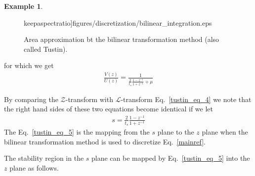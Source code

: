 \documentclass[11pt,a4paper,oneside]{book}
\numberwithin{equation}{section}
\theoremstyle{it}
\theoremstyle{definition}
\newtheorem{example}{Example}[chapter]
\begin{document}
\begin{example}
\begin{figure}[H]
	keepaspectratio]{figures/discretization/bilinear_integration.eps}
	\captionsetup{width=0.5\textwidth, font=small}		
	\caption{Area approximation bt the bilinear transformation method (also 
	called Tustin).}
	\label{figure_discretization_4}
\end{figure}
for which we get
\begin{equation}\label{tustin_eq_4}
	\begin{split}
		\frac{V(z)}{U(z)} = \frac{1}{\frac{2}{t_s}\frac{1-z^{-1}}{1+z^{-1}}+\mu}
	\end{split}
\end{equation}
\begin{mybox}
	By comparing the $\mathcal{Z}$-transform with $\mathcal{L}$-transform 
	Eq.~\eqref{tustin_eq_4} we note that the right hand sides of these two 
	equations become identical if we let
	\begin{equation}\label{tustin_eq_5}
		\begin{split}
			s = \frac{2}{t_s}\frac{1-z^{-1}}{1+z^{-1}}
		\end{split}
	\end{equation}
	The Eq.~\eqref{tustin_eq_5} is the mapping from the $s$ plane to the $z$ 
	plane when the bilinear transformation method is used to discretize 
	Eq.~\eqref{mainref}.
\end{mybox}

The stability region in the $s$ plane can be mapped by Eq.~\eqref{tustin_eq_5} into the $z$ plane as follows.


\end{example}
\end{document}
